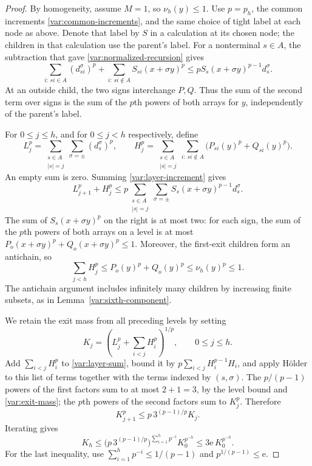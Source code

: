 \begin{proof}
By homogeneity, assume $M=1$, so $\nu_h(y)\le1$.  Use $p=p_h$,
the common increments \eqref{var:common-increments}, and the same
choice of tight label at each node as above.  Denote that label by
$S$ in a calculation at its chosen node; the children in that
calculation use the parent's label.  For a nonterminal $s\in A$,
the subtraction that gave \eqref{var:normalized-recursion} gives
\begin{equation}\label{var:layer-increment}
 \sum_{i:\,si\in A}(d_{si}^\sigma)^p
 +\sum_{i:\,si\notin A} S_{si}(x+\sigma y)^p
 \le pS_s(x+\sigma y)^{p-1}d_s^\sigma.
\end{equation}
At an outside child, the two signs interchange $P,Q$.  Thus the sum
of the second term over signs is the sum of the $p$th powers of
both arrays for $y$, independently of the parent's label.

For $0\le j\le h$, and for $0\le j<h$ respectively, define
\[
 L_j^p=\sum_{\substack{s\in A\\|s|=j}}\sum_{\sigma=\pm}
                   (d_s^\sigma)^p,
 \qquad
 H_j^p=\sum_{\substack{s\in A\\|s|=j}}
             \sum_{i:\,si\notin A}
                  \bigl(P_{si}(y)^p+Q_{si}(y)^p\bigr).
\]
An empty sum is zero.  Summing \eqref{var:layer-increment} gives
\begin{equation}\label{var:layer-sum}
 L_{j+1}^p+H_j^p
 \le p\sum_{\substack{s\in A\\|s|=j}}\sum_{\sigma=\pm}
                    S_s(x+\sigma y)^{p-1}d_s^\sigma.
\end{equation}
The sum of $S_s(x+\sigma y)^p$ on the right is at most two:
for each sign, the sum of the $p$th powers of both arrays on a
level is at most $P_o(x+\sigma y)^p+Q_o(x+\sigma y)^p\le1$.
Moreover, the first-exit children form an antichain, so
\begin{equation}\label{var:exit-mass}
 \sum_{j<h}H_j^p
 \le P_o(y)^p+Q_o(y)^p\le\nu_h(y)^p\le1.
\end{equation}
The antichain argument includes infinitely many children by
increasing finite subsets, as in Lemma~\ref{var:sixth-component}.

We retain the exit mass from all preceding levels by setting
\[
 K_j=\left(L_j^p+\sum_{i<j}H_i^p\right)^{1/p},
 \qquad 0\le j\le h.
\]
Add $\sum_{i<j}H_i^p$ to \eqref{var:layer-sum}, bound it by
$p\sum_{i<j}H_i^{p-1}H_i$, and apply H\"older to this list of
terms together with the terms indexed by $(s,\sigma)$.
The $p/(p-1)$ powers of the first factors sum to at most
$2+1=3$, by the level bound and \eqref{var:exit-mass}; the
$p$th powers of the second factors sum to $K_j^p$.  Therefore
\begin{equation}\label{var:accumulated-recursion}
 K_{j+1}^p\le p\,3^{(p-1)/p}K_j.
\end{equation}
Iterating gives
\begin{equation}\label{var:accumulated-bound}
 K_h\le
 \bigl(p\,3^{(p-1)/p}\bigr)^{\sum_{i=1}^{h}p^{-i}}
 K_0^{p^{-h}}
 \le3\mathrm e\,K_0^{p^{-h}}.
\end{equation}
For the last inequality, use
$\sum_{i=1}^{h}p^{-i}\le1/(p-1)$ and
$p^{1/(p-1)}\le\mathrm e$.


\end{proof}
